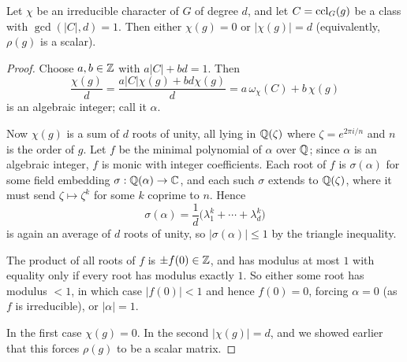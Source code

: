 \documentclass[a4paper]{scrartcl}
\begin{document}
\begin{lemma}
	Let $\chi$ be an irreducible character of $G$ of degree $d$, and let $C = \operatorname{ccl}_G(g)$ be a class with $\gcd(|C|, d) = 1$. Then either $\chi(g) = 0$ or $|\chi(g)| = d$ (equivalently, $\rho(g)$ is a scalar).
\end{lemma}
\begin{proof}
	Choose $a,b\in\mathbb{Z}$ with $a|C| + bd = 1$. Then
	$$\frac{\chi(g)}{d} = \frac{a|C|\chi(g) + bd\chi(g)}{d} = a\,\omega_\chi(C) + b\,\chi(g)$$
	is an algebraic integer; call it $\alpha$.

	Now $\chi(g)$ is a sum of $d$ roots of unity, all lying in $\mathbb{Q}(\zeta)$ where $\zeta = e^{2\pi i/n}$ and $n$ is the order of $g$. Let $f$ be the minimal polynomial of $\alpha$ over $\mathbb{Q}$; since $\alpha$ is an algebraic integer, $f$ is monic with integer coefficients. Each root of $f$ is $\sigma(\alpha)$ for some field embedding $\sigma : \mathbb{Q}(\alpha)\to\mathbb{C}$, and each such $\sigma$ extends to $\mathbb{Q}(\zeta)$, where it must send $\zeta\mapsto\zeta^k$ for some $k$ coprime to $n$. Hence
	$$\sigma(\alpha) = \frac1d\big(\lambda_1^k+\cdots+\lambda_d^k\big)$$
	is again an average of $d$ roots of unity, so $|\sigma(\alpha)|\leq 1$ by the triangle inequality.

	The product of all roots of $f$ is $\pm f(0)\in\mathbb{Z}$, and has modulus at most $1$ with equality only if every root has modulus exactly $1$. So either some root has modulus $<1$, in which case $|f(0)| < 1$ and hence $f(0) = 0$, forcing $\alpha = 0$ (as $f$ is irreducible), or $|\alpha| = 1$.

	In the first case $\chi(g) = 0$. In the second $|\chi(g)| = d$, and we showed earlier that this forces $\rho(g)$ to be a scalar matrix.
\end{proof}
\end{document}
